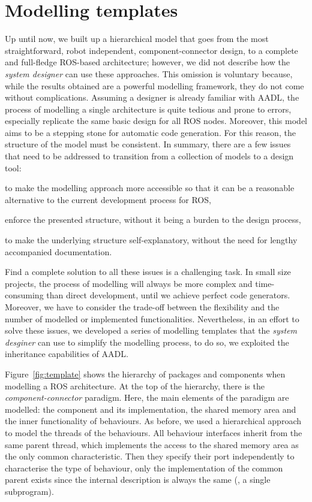 \section{Modelling templates}
\label{sec:template}
Up until now, we built up a hierarchical model that goes from the most straightforward, robot independent, component-connector design, to a complete and full-fledge ROS-based architecture; however, we did not describe how the \textit{system designer} can use these approaches. This omission is voluntary because, while the results obtained are a powerful modelling framework, they do not come without complications. Assuming a designer is already familiar with AADL, the process of modelling a single architecture is quite tedious and prone to errors, especially replicate the same basic design for all ROS nodes. Moreover, this model aims to be a stepping stone for automatic code generation. For this reason, the structure of the model must be consistent. In summary, there are a few issues that need to be addressed to transition from a collection of models to a design tool:
\begin{enumerate*}[label={\alph*)}]
\item to make the modelling approach more accessible so that it can be a reasonable alternative to the current development process for ROS,
\item enforce the presented structure, without it being a burden to the design process,
\item to make the underlying structure self-explanatory, without the need for lengthy accompanied documentation.
\end{enumerate*}

Find a complete solution to all these issues is a challenging task. In small size projects, the process of modelling will always be more complex and time-consuming than direct development, until we achieve perfect code generators.  Moreover, we have to consider the trade-off between the flexibility and the number of modelled or implemented functionalities. Nevertheless, in an effort to solve these issues, we developed a series of modelling templates that the \textit{system desginer} can use to simplify the modelling process, to do so, we exploited the inheritance capabilities of AADL.

Figure~\ref{fig:template} shows the hierarchy of packages and components when modelling a ROS architecture. At the top of the hierarchy, there is the \textit{component-connector} paradigm. Here, the main elements of the paradigm are modelled: the component and its implementation, the shared memory area and the inner functionality of behaviours. As before, we used a hierarchical approach to model the threads of the behaviours. All behaviour interfaces inherit from the same parent thread, which implements the access to the shared memory area as the only common characteristic. Then they specify their port independently to characterise the type of behaviour, only the implementation of the common parent exists since the internal description is always the same (\ie, a single subprogram).

